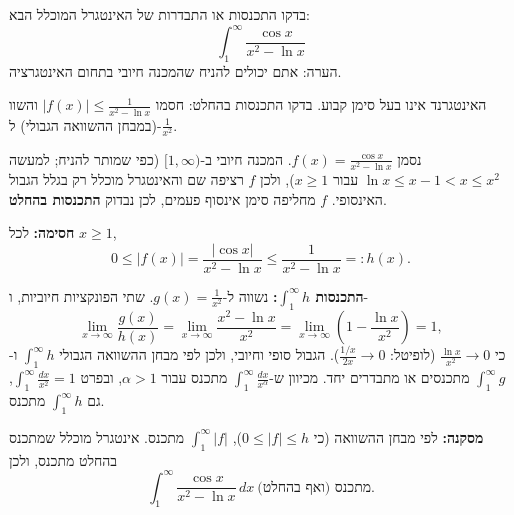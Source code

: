 
\begin{question}
בדקו התכנסות או התבדרות של האינטגרל המוכלל הבא:
\[ \int_1^\infty \frac{\cos x}{x^2 - \ln x} \]
הערה: אתם יכולים להניח שהמכנה חיובי בתחום האינטגרציה.
\end{question}

\begin{hint}
האינטגרנד אינו בעל סימן קבוע. בדקו התכנסות בהחלט: חסמו $|f(x)| \le \frac{1}{x^2 - \ln x}$ והשוו (במבחן ההשוואה הגבולי) ל-$\frac{1}{x^2}$.
\end{hint}

\begin{solution}
נסמן $f(x) = \frac{\cos x}{x^2 - \ln x}$. המכנה חיובי ב-$[1, \infty)$ (כפי שמותר להניח; למעשה $\ln x \le x - 1 < x \le x^2$ עבור $x \ge 1$), ולכן $f$ רציפה שם והאינטגרל מוכלל רק בגלל הגבול האינסופי. $f$ מחליפה סימן אינסוף פעמים, לכן נבדוק \textbf{התכנסות בהחלט}.

\textbf{חסימה:} לכל $x \ge 1$,
\[ 0 \le |f(x)| = \frac{|\cos x|}{x^2 - \ln x} \le \frac{1}{x^2 - \ln x} =: h(x). \]

\textbf{התכנסות $\int_1^\infty h$:} נשווה ל-$g(x) = \frac{1}{x^2}$. שתי הפונקציות חיוביות, ו-
\[ \lim_{x\to\infty} \frac{g(x)}{h(x)} = \lim_{x\to\infty} \frac{x^2 - \ln x}{x^2} = \lim_{x\to\infty} \left( 1 - \frac{\ln x}{x^2} \right) = 1, \]
כי $\frac{\ln x}{x^2} \to 0$ (לופיטל: $\frac{1/x}{2x} \to 0$). הגבול סופי וחיובי, ולכן לפי מבחן ההשוואה הגבולי $\int_1^\infty h$ ו-$\int_1^\infty g$ מתכנסים או מתבדרים יחד. מכיוון ש-$\int_1^\infty \frac{dx}{x^\alpha}$ מתכנס עבור $\alpha > 1$, ובפרט $\int_1^\infty \frac{dx}{x^2} = 1$, גם $\int_1^\infty h$ מתכנס.

\textbf{מסקנה:} לפי מבחן ההשוואה (כי $0 \le |f| \le h$), $\int_1^\infty |f|$ מתכנס. אינטגרל מוכלל שמתכנס בהחלט מתכנס, ולכן
\[ \int_1^\infty \frac{\cos x}{x^2 - \ln x}\,dx \ \text{מתכנס (ואף בהחלט).} \]
\end{solution}
